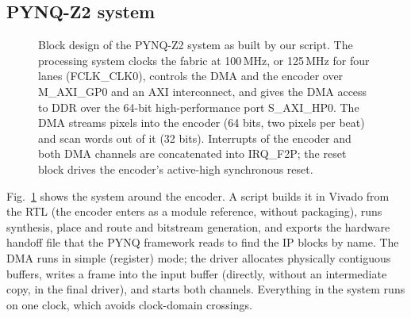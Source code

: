 \subsection{PYNQ-Z2 system}\label{sec:zynq}
\begin{figure}[t]
\centering
\resizebox{\textwidth}{!}{}
\caption{Block design of the PYNQ-Z2 system as built by our script. The processing system clocks the fabric at 100\,MHz, or 125\,MHz for four lanes (FCLK\_CLK0), controls the DMA and the encoder over M\_AXI\_GP0 and an AXI interconnect, and gives the DMA access to DDR over the 64-bit high-performance port S\_AXI\_HP0. The DMA streams pixels into the encoder (64 bits, two pixels per beat) and scan words out of it (32 bits). Interrupts of the encoder and both DMA channels are concatenated into IRQ\_F2P; the reset block drives the encoder's active-high synchronous reset.}
\label{fig:zynq}
\end{figure}
Fig.~\ref{fig:zynq} shows the system around the encoder. A script builds it in Vivado from the RTL (the encoder enters as a module reference, without packaging), runs synthesis, place and route and bitstream generation, and exports the hardware handoff file that the PYNQ framework reads to find the IP blocks by name. The DMA runs in simple (register) mode; the driver allocates physically contiguous buffers, writes a frame into the input buffer (directly, without an intermediate copy, in the final driver), and starts both channels. Everything in the system runs on one clock, which avoids clock-domain crossings.

